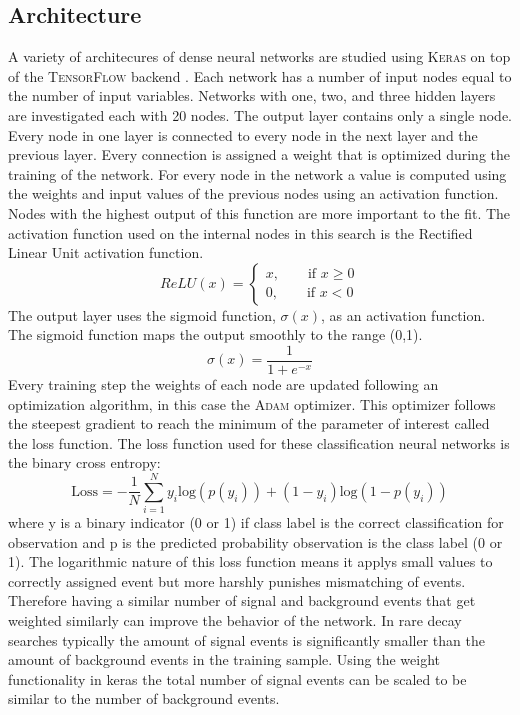 \subsection{Architecture}

A variety of architecures of dense neural networks are studied using \textsc{Keras}\cite{Keras} on top of the \textsc{TensorFlow} backend \cite{TensorFlow}.  Each network has a number of input nodes equal to the number of input variables.  Networks with one, two, and three hidden layers are investigated each with 20 nodes.  The output layer contains only a single node.  Every node in one layer is connected to every node in the next layer and the previous layer.  Every connection is assigned a weight that is optimized during the training of the network.  For every node in the network a value is computed using the weights and input values of the previous nodes using an activation function.  Nodes with the highest output of this function are more important to the fit.  The activation function used on the internal nodes in this search is the Rectified Linear Unit activation function.
\[ ReLU(x) = 
\begin{cases}
x, \qquad \text{if } x \geq 0\\
0, \qquad \text{if } x < 0
\end{cases}
\]
The output layer uses the sigmoid function, $\sigma(x)$, as an activation function.  The sigmoid function maps the output smoothly to the range (0,1).
\[ \sigma(x) = \frac{1}{1+e^{-x}}
\]
Every training step the weights of each node are updated following an optimization algorithm, in this case the \textsc{Adam} optimizer\cite{AdamOpt}.  This optimizer follows the steepest gradient to reach the minimum of the parameter of interest called the loss function.  The loss function used for these classification neural networks is the binary cross entropy:
\[\text{Loss} = -\frac{1}{N}\sum_{i=1}^{N}y_{i} \text{log}(p(y_{i}))+(1-y_{i})\text{log}(1-p(y_{i}))\]
where y is a binary indicator (0 or 1) if class label is the correct classification for observation and p is the predicted probability observation is the class label (0 or 1).  The logarithmic nature of this loss function means it applys small values to correctly assigned event but more harshly punishes mismatching of events.  Therefore having a similar number of signal and background events that get weighted similarly can improve the behavior of the network.  In rare decay searches typically the amount of signal events is significantly smaller than the amount of background events in the training sample.  Using the weight functionality in keras the total number of signal events can be scaled to be similar to the number of background events. 

